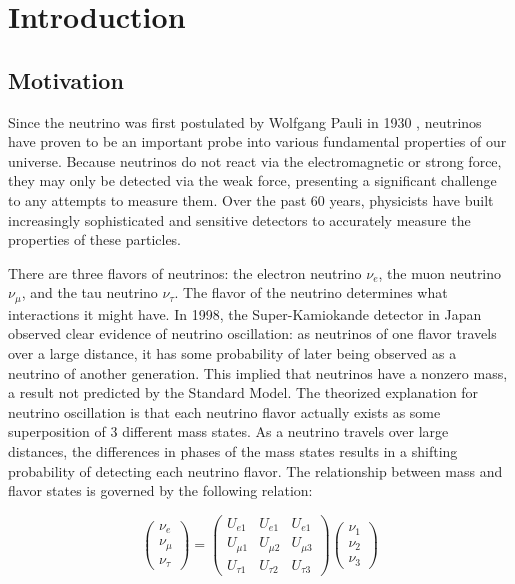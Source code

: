 
\chapter{Introduction}
\label{ch:Introduction}

\section{Motivation}

Since the neutrino was first postulated by Wolfgang Pauli in 1930 \cite{neutrinoHistory}, neutrinos have proven to be an important probe into various fundamental properties of our universe.
Because neutrinos do not react via the electromagnetic or strong force, they may only be detected via the weak force, presenting a significant challenge to any attempts to measure them.
Over the past 60 years, physicists have built increasingly sophisticated and sensitive detectors to accurately measure the properties of these particles.

There are three flavors of neutrinos: the electron neutrino $\nu_e$, the muon neutrino $\nu_\mu$, and the tau neutrino $\nu_\tau$.
The flavor of the neutrino determines what interactions it might have.
In 1998, the Super-Kamiokande detector in Japan observed clear evidence of neutrino oscillation: as neutrinos of one flavor travels over a large distance, it has some probability of later being observed as a neutrino of another generation.
This implied that neutrinos have a nonzero mass, a result not predicted by the Standard Model.
The theorized explanation for neutrino oscillation is that each neutrino flavor actually exists as some superposition of 3 different mass states. As a neutrino travels over large distances, the differences in phases of the mass states results in a shifting probability of detecting each neutrino flavor.
The relationship between mass and flavor states is governed by the following relation:

\begin{equation}
\begin{pmatrix}
\nu_e \\ \nu_\mu \\ \nu_\tau
\end{pmatrix}
=
\begin{pmatrix}
U_{e1} & U_{e1} & U_{e1} \\ 
U_{\mu 1} & U_{\mu 2} & U_{\mu 3} \\
U_{\tau 1} & U_{\tau 2} & U_{\tau 3}
\end{pmatrix}
\begin{pmatrix}
\nu_1 \\ \nu_2 \\ \nu_3
\end{pmatrix}
\end{equation}

